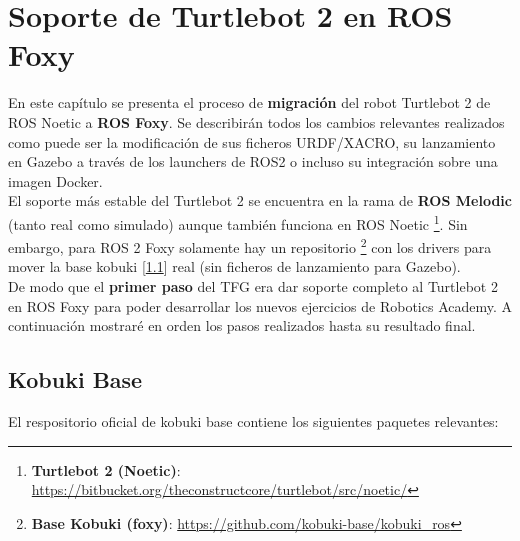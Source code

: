 \chapter{Soporte de Turtlebot 2 en ROS Foxy}
\label{cap:capitulo4}

En este capítulo se presenta el proceso de \textbf{migración} del robot Turtlebot 2 de ROS Noetic a \textbf{ROS Foxy}. Se describirán todos los cambios relevantes realizados como puede ser la modificación de sus ficheros URDF/XACRO, su lanzamiento en Gazebo a través de los launchers de ROS2 o incluso su integración sobre una imagen Docker.\\

El soporte más estable del Turtlebot 2 se encuentra en la rama de \textbf{ROS Melodic} (tanto real como simulado) aunque también funciona en ROS Noetic \footnote{\textbf{Turtlebot 2 (Noetic)}: \url{https://bitbucket.org/theconstructcore/turtlebot/src/noetic/}}. Sin embargo, para ROS 2 Foxy solamente hay un repositorio \footnote{\textbf{Base Kobuki (foxy)}: \url{https://github.com/kobuki-base/kobuki_ros}} con los drivers para mover la base kobuki [\ref{sec:kobuki_base}] real (sin  ficheros de lanzamiento para Gazebo).\\

De modo que el \textbf{primer paso} del TFG era dar soporte completo al Turtlebot 2 en ROS Foxy para poder desarrollar los nuevos ejercicios de Robotics Academy. A continuación mostraré en orden los pasos realizados hasta su resultado final.\\


\section{Kobuki Base}
\label{sec:kobuki_base}

El respositorio oficial de kobuki base contiene los siguientes paquetes relevantes:

